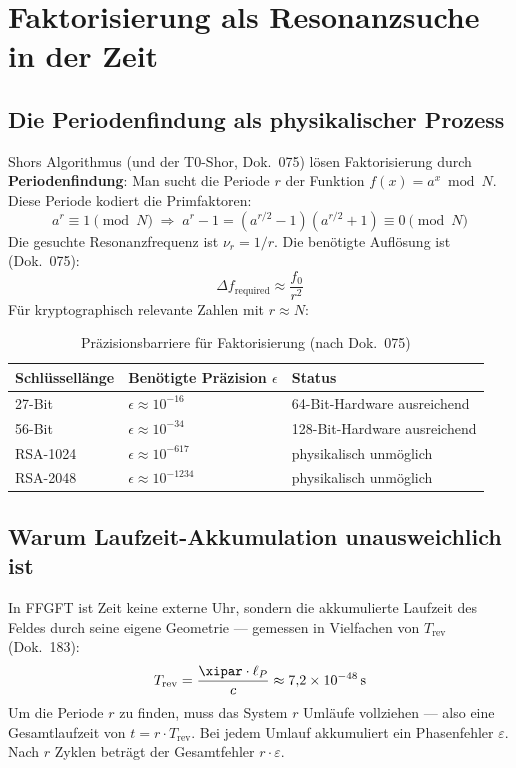 \section{Faktorisierung als Resonanzsuche in der Zeit}

\subsection{Die Periodenfindung als physikalischer Prozess}

Shors Algorithmus (und der T0-Shor, Dok.~075) lösen Faktorisierung durch
\textbf{Periodenfindung}: Man sucht die Periode $r$ der Funktion
$f(x) = a^x \bmod N$. Diese Periode kodiert die Primfaktoren:
\begin{equation}
    a^r \equiv 1 \pmod{N}
    \;\Rightarrow\;
    a^r - 1 = (a^{r/2} - 1)(a^{r/2} + 1) \equiv 0 \pmod{N}
\end{equation}
Die gesuchte Resonanzfrequenz ist $\nu_r = 1/r$. Die benötigte Auflösung ist
(Dok.~075):
\begin{equation}
    \Delta f_\text{required} \approx \frac{f_0}{r^2}
\end{equation}
Für kryptographisch relevante Zahlen mit $r \approx N$:

\begin{table}[ht]
\centering
\begin{tabular}{|l|l|l|}
\hline
\textbf{Schlüssellänge} & \textbf{Benötigte Präzision $\epsilon$} & \textbf{Status} \\
\hline
27-Bit & $\epsilon \approx 10^{-16}$ & 64-Bit-Hardware ausreichend \\
\hline
56-Bit & $\epsilon \approx 10^{-34}$ & 128-Bit-Hardware ausreichend \\
\hline
RSA-1024 & $\epsilon \approx 10^{-617}$ & physikalisch unmöglich \\
\hline
RSA-2048 & $\epsilon \approx 10^{-1234}$ & physikalisch unmöglich \\
\hline
\end{tabular}
\caption{Präzisionsbarriere für Faktorisierung (nach Dok.~075)}
\end{table}

\subsection{Warum Laufzeit-Akkumulation unausweichlich ist}

In FFGFT ist Zeit keine externe Uhr, sondern die akkumulierte Laufzeit des Feldes
durch seine eigene Geometrie — gemessen in Vielfachen von $T_\text{rev}$ (Dok.~183):
\begin{equation}
    T_\text{rev} = \frac{\xipar \cdot \ell_P}{c} \approx 7{,}2 \times 10^{-48}\,\text{s}
\end{equation}
Um die Periode $r$ zu finden, muss das System $r$ Umläufe vollziehen — also eine
Gesamtlaufzeit von $t = r \cdot T_\text{rev}$. Bei jedem Umlauf akkumuliert ein
Phasenfehler $\varepsilon$. Nach $r$ Zyklen beträgt der Gesamtfehler $r \cdot \varepsilon$.

